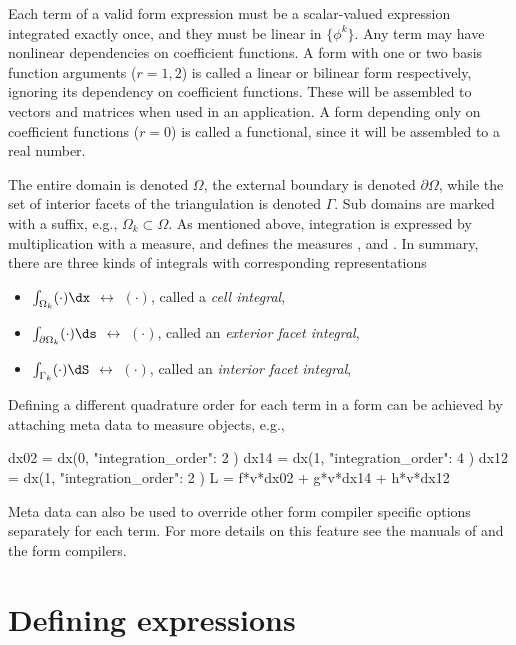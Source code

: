 Each term of a valid form expression must be a scalar-valued
expression integrated exactly once, and they must be linear in $\{
\phi^k \}$.  Any term may have nonlinear dependencies on coefficient
functions.  A form with one or two basis function arguments ($r=1,2$)
is called a linear or bilinear form respectively, ignoring its
dependency on coefficient functions. These will be assembled to
vectors and matrices when used in an application.  A form depending
only on coefficient functions ($r=0$) is called a functional, since it
will be assembled to a real number.

The entire domain is denoted $\Omega$, the external boundary is
denoted $\partial\Omega$, while the set of interior facets of the
triangulation is denoted $\Gamma$. Sub domains are marked with a
suffix, e.g., $\Omega_k \subset \Omega$. As mentioned above,
integration is expressed by multiplication with a measure, and \ufl{}
defines the measures ,  and .  In
summary, there are three kinds of integrals with corresponding \ufl{}
representations
\begin{itemize}
\item $\int_{        \Omega_k} (\cdot) \dx$ $\leftrightarrow$  $(\cdot)$, called a \emph{cell integral},
\item $\int_{\partial\Omega_k} (\cdot) \ds$ $\leftrightarrow$  $(\cdot)$, called an \emph{exterior facet integral},
\item $\int_{        \Gamma_k} (\cdot) \dS$ $\leftrightarrow$  $(\cdot)$, called an \emph{interior facet integral},
\end{itemize}
Defining a different quadrature order for each term in a form can be
achieved by attaching meta data to measure objects, e.g.,
\begin{code}
dx02 = dx(0, { "integration_order": 2 })
dx14 = dx(1, { "integration_order": 4 })
dx12 = dx(1, { "integration_order": 2 })
L = f*v*dx02 + g*v*dx14 + h*v*dx12
\end{code}
Meta data can also be used to override other form compiler specific
options separately for each term. For more details on this feature see
the manuals of \ufl{} and the form compilers.


\section{Defining expressions}
\label{ufl:sec:defexpr}

